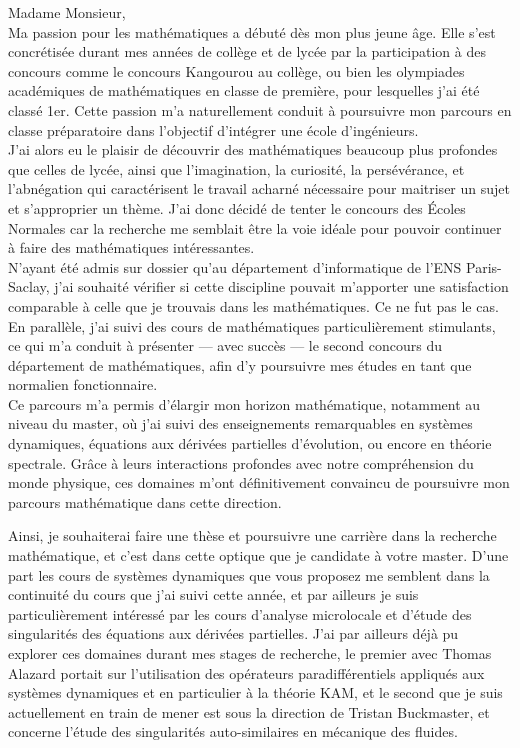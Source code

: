 \documentclass[12pt,a4paper]{article}
\begin{document}
Madame Monsieur, \\

Ma passion pour les mathématiques a débuté dès mon plus jeune âge. Elle s’est concrétisée durant mes années de collège et de lycée par la participation à des concours comme le concours Kangourou au collège, ou bien les olympiades académiques de mathématiques en classe de première, pour lesquelles j’ai été classé 1er.  Cette passion m’a naturellement conduit à poursuivre mon parcours en classe préparatoire dans l’objectif d’intégrer une école d’ingénieurs.  \\
J'ai alors eu le plaisir de découvrir des mathématiques beaucoup plus profondes que celles de lycée, ainsi que l’imagination, la curiosité, la persévérance, et l’abnégation qui caractérisent le travail acharné nécessaire pour maitriser un sujet et s'approprier un thème. J'ai donc décidé de tenter le concours des Écoles Normales car la recherche me semblait être la voie idéale pour pouvoir continuer à faire des mathématiques intéressantes. \\
N’ayant été admis sur dossier qu’au département d’informatique de l’ENS Paris-Saclay, j’ai souhaité vérifier si cette discipline pouvait m’apporter une satisfaction comparable à celle que je trouvais dans les mathématiques. Ce ne fut pas le cas. En parallèle, j’ai suivi des cours de mathématiques particulièrement stimulants, ce qui m’a conduit à présenter — avec succès — le second concours du département de mathématiques, afin d’y poursuivre mes études en tant que normalien fonctionnaire.\\
Ce parcours m’a permis d’élargir mon horizon mathématique, notamment au niveau du master, où j’ai suivi des enseignements remarquables en systèmes dynamiques, équations aux dérivées partielles d’évolution, ou encore en théorie spectrale. Grâce à leurs interactions profondes avec notre compréhension du monde physique, ces domaines m’ont définitivement convaincu de poursuivre mon parcours mathématique dans cette direction.

Ainsi, je souhaiterai faire une thèse et poursuivre une carrière dans la recherche mathématique, et c'est dans cette optique que je candidate à votre master. D'une part les cours de systèmes dynamiques que vous proposez me semblent dans la continuité du cours que j'ai suivi cette année, et par ailleurs je suis particulièrement intéressé par les cours d'analyse microlocale et d'étude des singularités des équations aux dérivées partielles. J'ai par ailleurs déjà pu explorer ces domaines durant mes stages de recherche, le premier avec Thomas Alazard portait sur l'utilisation des opérateurs paradifférentiels appliqués aux systèmes dynamiques et en particulier à la théorie KAM, et le second que je suis actuellement en train de mener est sous la direction de Tristan Buckmaster, et concerne l'étude des singularités auto-similaires en mécanique des fluides.
\end{document}
